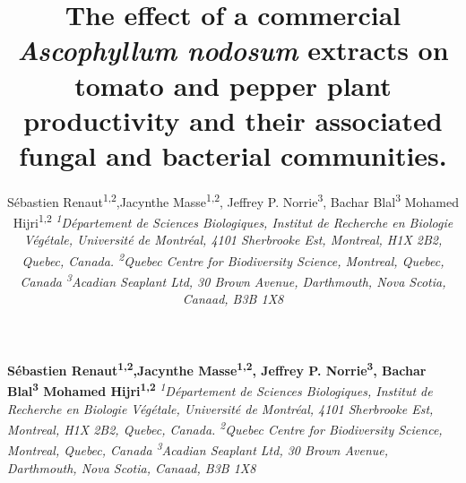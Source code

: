 \documentclass[11pt,]{article}
\title{\textbf{The effect of a commercial \emph{Ascophyllum nodosum} extracts
on tomato and pepper plant productivity and their associated fungal and
bacterial communities.}  }
\author{\Large Sébastien Renaut\textsuperscript{1,2},Jacynthe
Masse\textsuperscript{1,2}, Jeffrey P. Norrie\textsuperscript{3}, Bachar
Blal\textsuperscript{3} Mohamed Hijri\textsuperscript{1,2}\vspace{0.05in} \newline\normalsize\emph{\textsuperscript{1}Département de Sciences Biologiques, Institut de
Recherche en Biologie Végétale, Université de Montréal, 4101 Sherbrooke
Est, Montreal, H1X 2B2, Quebec, Canada. \textsuperscript{2}Quebec Centre
for Biodiversity Science, Montreal, Quebec, Canada
\textsuperscript{3}Acadian Seaplant Ltd, 30 Brown Avenue, Darthmouth,
Nova Scotia, Canaad, B3B 1X8}  }
\date{}
\newcommand*{\authorfont}{\fontfamily{phv}\selectfont}
\begin{document}
	
%

{%
\setlength{\parindent}{0pt}
\thispagestyle{plain}
{\fontsize{18}{20}\selectfont\raggedright 
\maketitle  %

}

{
   \vskip 13.5pt\relax \normalsize\fontsize{11}{12} 
\textbf{\authorfont Sébastien Renaut\textsuperscript{1,2},Jacynthe
Masse\textsuperscript{1,2}, Jeffrey P. Norrie\textsuperscript{3}, Bachar
Blal\textsuperscript{3} Mohamed Hijri\textsuperscript{1,2}} \hskip 15pt \emph{\small \textsuperscript{1}Département de Sciences Biologiques, Institut de
Recherche en Biologie Végétale, Université de Montréal, 4101 Sherbrooke
Est, Montreal, H1X 2B2, Quebec, Canada. \textsuperscript{2}Quebec Centre
for Biodiversity Science, Montreal, Quebec, Canada
\textsuperscript{3}Acadian Seaplant Ltd, 30 Brown Avenue, Darthmouth,
Nova Scotia, Canaad, B3B 1X8}   

}

}
\end{document}

